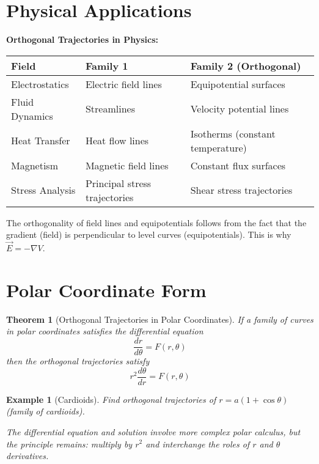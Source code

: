 \documentclass[12pt]{article}
\newtheorem{theorem}{Theorem}
\newtheorem{example}{Example}
\begin{document}
\section{Physical Applications}

\begin{keypoint}
\textbf{Orthogonal Trajectories in Physics:}
\begin{center}
\begin{tabular}{|l|l|l|}
\hline
\textbf{Field} & \textbf{Family 1} & \textbf{Family 2 (Orthogonal)} \\
\hline
Electrostatics & Electric field lines & Equipotential surfaces \\
Fluid Dynamics & Streamlines & Velocity potential lines \\
Heat Transfer & Heat flow lines & Isotherms (constant temperature) \\
Magnetism & Magnetic field lines & Constant flux surfaces \\
Stress Analysis & Principal stress trajectories & Shear stress trajectories \\
\hline
\end{tabular}
\end{center}
\end{keypoint}

\begin{insight}
The orthogonality of field lines and equipotentials follows from the fact that the gradient (field) is perpendicular to level curves (equipotentials). This is why $\vec{E} = -\nabla V$.
\end{insight}

\section{Polar Coordinate Form}

\begin{theorem}[Orthogonal Trajectories in Polar Coordinates]
If a family of curves in polar coordinates satisfies the differential equation
\[\frac{dr}{d\theta} = F(r,\theta)\]
then the orthogonal trajectories satisfy
\[r^{2}\frac{d\theta}{dr} = F(r,\theta)\]
\end{theorem}

\begin{example}[Cardioids]
Find orthogonal trajectories of $r = a(1 + \cos\theta)$ (family of cardioids).

The differential equation and solution involve more complex polar calculus, but the principle remains: multiply by $r^{2}$ and interchange the roles of $r$ and $\theta$ derivatives.
\end{example}
\end{document}
